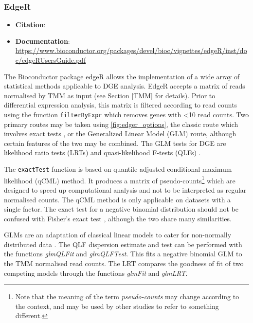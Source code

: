\subsubsection{EdgeR}
\label{EdgeR}
\begin{itemize}\itemsep-0.5em
\item[] \textbf{Citation}: 				\cite{edger}
\item[] \textbf{Documentation}: 	\url{https://www.bioconductor.org/packages/devel/bioc/vignettes/edgeR/inst/doc/edgeRUsersGuide.pdf}
\end{itemize}

The Bioconductor package edgeR allows the implementation of a wide array of statistical methods applicable to \ac{DGE} analysis. EdgeR accepts a matrix of reads normalised by \ac{TMM} as input (see Section \ref{TMM} for details). Prior to differential expression analysis, this matrix is filtered according to read counts using the function \texttt{filterByExpr} which removes genes with <10 read counts. Two primary routes may be taken using \autoref{fig:edger_options}, the classic route which involves exact tests \citep{robinson2007moderated, robinson2008small}, or the Generalized Linear Model (GLM) route, although certain features of the two may be combined. The GLM tests for \ac{DGE} are likelihood ratio tests (LRTs) \citep{mccarthy2012differential} and quasi-likelihood F-tests (QLFs) \citep{lun2016s, lund2012detecting}.

The \texttt{exactTest} function is based on quantile-adjusted conditional maximum likelihood (qCML) method. It produces a matrix of pseudo-counts\footnote{Note that the meaning of the term \textit{pseudo-counts} may change according to the context, and may be used by other studies to refer to something different.} which are designed to speed up computational analysis and not to be interpreted as regular normalised counts. The qCML method is only applicable on datasets with a single factor. The exact test for a negative binomial distribution should not be confused with Fisher’s exact test \citep{upton1992fisher}, although the two share many similarities.

GLMs are an adaptation of classical linear models to cater for non-normally distributed data \citep{dunn2018generalized}. The QLF dispersion estimate and test can be performed with the functions \textit{glmQLFit} and \textit{glmQLFTest}. This fits a negative binomial GLM to the \ac{TMM} normalised read counts. The LRT compares the goodness of fit of two competing models through the functions \textit{glmFit} and \textit{glmLRT}.

